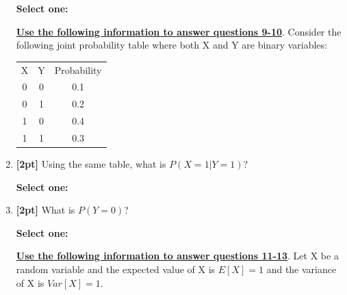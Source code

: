 \documentclass[12pt]{article}
\renewcommand{\circle}{\tikz\draw[black] (0,0) circle (1ex);}
\begin{document}
\begin{enumerate}
    \textbf{Select one:}

    
    \bigskip\bigskip\bigskip
    \textbf{\underline{Use the following information to answer questions 9-10}}. Consider the following joint probability table where both X and Y are binary variables:\\[12pt] 
    \begin{tabular}{ccc}
    X & Y & Probability \\
    0 & 0 & 0.1\\
    0 & 1 & 0.2\\
    1 & 0 & 0.4\\
    1 & 1 & 0.3
    \end{tabular}


    \item \textbf{[2pt]} Using the same table, what is $P(X = 1 | Y=1)$?

    \textbf{Select one:}


    \item \textbf{[2pt]} What is $P(Y=0)$?

    \textbf{Select one:}

    
    
    \bigskip\bigskip\bigskip
    \textbf{\underline{Use the following information to answer questions 11-13}}. Let X be a random variable and the expected value of X is $E[X] = 1$ and the variance of X is $Var[X] = 1$. 


\end{enumerate}
\end{document}
